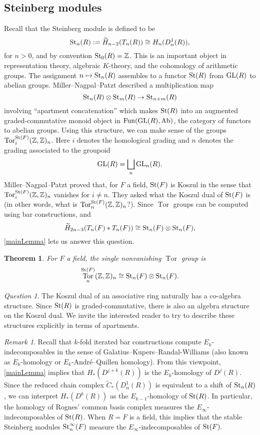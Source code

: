 \documentclass[a4paper]{amsart}
\DeclareMathOperator{\Tor}{Tor}
\DeclareMathOperator{\Ab}{Ab}
\DeclareMathOperator{\Fun}{Fun}
\newcommand{\m}{\to}
\newcommand{\Z}{\mathbb{Z}}
\numberwithin{theoremcounter}{section}
\newtheorem{theorem}[theoremauto]{Theorem}
\theoremstyle{definition}
\theoremstyle{remark}
\newtheorem{remark}[remarkauto]{Remark}
\newtheorem{question}[questionauto]{Question}
\newcommand{\mr}[1]{{\rm #1}}
\newcommand{\GL}{\mr{GL}}
\newcommand{\St}{\mr{St}}
\begin{document}
\subsection{Steinberg modules} 

Recall that the Steinberg module is defined to be \[\St_n(R):=\widetilde H_{n-2}(T_n(R)) \cong H_n(D_n^1(R)),\] for $n>0$, and by convention $\St_0(R)=\Z$. This is an important object in representation theory, algebraic $K$-theory, and the cohomology of arithmetic groups. The assignment $n \mapsto \St_n(R)$ assembles to a functor $\St(R)$ from $\GL(R)$ to abelian groups. Miller--Nagpal--Patzt \cite{MNP} described a multiplication map \[\St_n(R) \otimes \St_m(R) \m \St_{n+m}(R) \] involving  ``apartment concatenation'' which makes $\St(R)$ into an augmented graded-commutative monoid object in $\Fun(\GL(R),\Ab)$, the category of functors to abelian groups. Using this structure, we can make sense of the groups $\Tor^{\St(F)}_i(\Z,\Z)_n$. Here $i$ denotes the homological grading and $n$ denotes the grading associated to the groupoid \[\GL(R)=\bigsqcup_n \GL_n(R).\] Miller--Nagpal--Patzt proved that, for $F$ a field, $\St(F)$ is Koszul in the sense that $\Tor^{\St(F)}_i(\Z,\Z)_n$ vanishes for $i \neq n$. They asked what the Koszul dual of $\St(F)$ is \cite[Question 3.11]{MNP} (in other words, what is $\Tor^{\St(F)}_n(\Z,\Z)_n$?). Since $\Tor$ groups can be computed using bar constructions, and
$$ \widetilde{H}_{2n-3}(T_n(F) * T_n(F) ) \cong \St_n(F) \otimes \St_n(F),$$ 
 \autoref{mainLemma} lets us answer this question. 


\begin{theorem} \label{KD}
For $F$ a field, the single nonvanishing $\Tor$ group is $$\Tor^{\St(F)}_n(\Z,\Z)_n \cong \St_n(F) \otimes \St_n(F).$$
\end{theorem}

\begin{question}
The Koszul dual of an associative ring naturally has a co-algebra structure. Since $\St(R)$ is graded-commutative, there is also an algebra structure on the Koszul dual. We invite the interested reader to try to describe these structures explicitly in terms of apartments. 
\end{question}



\begin{remark}
Recall that $k$-fold iterated bar constructions compute $E_k$-indecomposables in the sense of Galatius--Kupers--Randal-Williams \cite{e2cellsI} (also known as $E_k$-homology or $E_k$-Andr\'e--Quillen homology). From this viewpoint, \autoref{mainLemma} implies that $H_*(D^{j+k}(R))$ is the $E_k$-homology of $D^j(R)$. Since the reduced chain complex  $ \widetilde{C}_*(D^1_n(R))$ is equivalent to a shift of $\St_n(R)$, we can interpret $H_*(D^{k}(R))$ as the $E_{k-1}$-homology  of $\St(R)$. In particular, the homology of Rognes' common basis complex measures the $E_\infty$-indecomposables of $\St(R)$. When $R=F$ is a field, this implies that the stable Steinberg modules $\St^{\infty}_n(F)$ measure the $E_\infty$-indecomposables of $\St(F).$
\end{remark}
\end{document}
